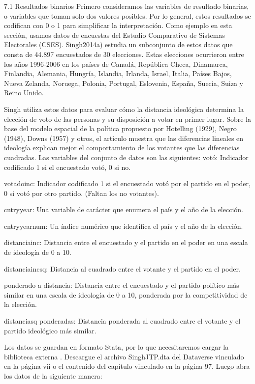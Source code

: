 \documentclass[
]{book}
\begin{document}
7.1 Resultados binarios
Primero consideramos las variables de resultado binarias, o variables que toman solo dos valores posibles. Por lo general, estos resultados se codifican con 0 o 1 para simplificar la interpretación. Como ejemplo en esta sección, usamos datos de encuestas del Estudio Comparativo de Sistemas Electorales (CSES). Singh2014a) estudia un subconjunto de estos datos que consta de 44.897 encuestados de 30 elecciones. Estas elecciones ocurrieron entre los años 1996-2006 en los países de Canadá, República Checa, Dinamarca, Finlandia, Alemania, Hungría, Islandia, Irlanda, Israel, Italia, Países Bajos, Nueva Zelanda, Noruega, Polonia, Portugal, Eslovenia, España, Suecia, Suiza y Reino Unido.

Singh utiliza estos datos para evaluar cómo la distancia ideológica determina la elección de voto de las personas y su disposición a votar en primer lugar. Sobre la base del modelo espacial de la política propuesto por Hotelling (1929), Negro (1948), Downs (1957) y otros, el artículo muestra que las diferencias lineales en ideología explican mejor el comportamiento de los votantes que las diferencias cuadradas. Las variables del conjunto de datos son las siguientes:
votó:
Indicador codificado 1 si el encuestado votó, 0 si no.

votadoinc:
Indicador codificado 1 si el encuestado votó por el partido en el poder, 0 si votó por otro partido. (Faltan los no votantes).

cntryyear:
Una variable de carácter que enumera el país y el año de la elección.

cntryyearnum:
Un índice numérico que identifica el país y el año de la elección.

distanciainc:
Distancia entre el encuestado y el partido en el poder en una escala de ideología de 0 a 10.

distanciaincsq:
Distancia al cuadrado entre el votante y el partido en el poder.

ponderado a distancia:
Distancia entre el encuestado y el partido político más similar en una escala de ideología de 0 a 10, ponderada por la competitividad de la elección.

distanciasq ponderadas:
Distancia ponderada al cuadrado entre el votante y el partido ideológico más similar.

Los datos se guardan en formato Stata, por lo que necesitaremos cargar la biblioteca externa . Descargue el archivo SinghJTP.dta del Dataverse vinculado en la página vii o el contenido del capítulo vinculado en la página 97. Luego abra los datos de la siguiente manera:
\end{document}
